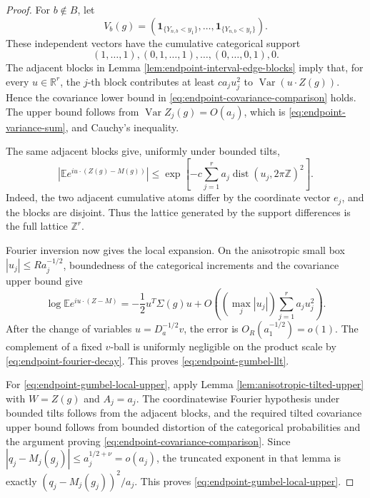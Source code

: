 \documentclass[11pt]{article}
\theoremstyle{remark}
\newcommand{\Ee}{\mathbb E}
\newcommand{\one}{\mathbf 1}
\newcommand{\Var}{\operatorname{Var}}
\begin{document}
\begin{proof}
For \(b\notin B\), let
\[
        V_b(g)=
        (\one_{\{Y_{n,b}<y_1\}},\ldots,
         \one_{\{Y_{n,b}<y_r\}}).
\]
These independent vectors have the cumulative categorical support
\[
        (1,\ldots,1),(0,1,\ldots,1),\ldots,(0,\ldots,0,1),0.
\]
The adjacent blocks in Lemma \ref{lem:endpoint-interval-edge-blocks} imply
that, for every \(u\in\mathbb R^r\), the \(j\)-th block contributes at least
\(ca_ju_j^2\) to \(\Var(u\cdot Z(g))\).  Hence the covariance lower bound in
\eqref{eq:endpoint-covariance-comparison} holds.  The upper bound follows from
\(\Var Z_j(g)=O(a_j)\), which is
\eqref{eq:endpoint-variance-sum}, and Cauchy's inequality.

The same adjacent blocks give, uniformly under bounded tilts,
\[
        |\Ee e^{iu\cdot(Z(g)-M(g))}|
        \le\exp\left[-c\sum_{j=1}^r
        a_j\operatorname{dist}(u_j,2\pi\mathbb Z)^2\right].
\tag{8.15}\label{eq:endpoint-fourier-decay}
\]
Indeed, the two adjacent cumulative atoms differ by the coordinate vector
\(e_j\), and the blocks are disjoint.  Thus the lattice generated by the
support differences is the full lattice \(\mathbb Z^r\).

Fourier inversion now gives the local expansion.  On the anisotropic small box
\(|u_j|\le Ra_j^{-1/2}\), boundedness of the categorical increments and the
covariance upper bound give
\[
\log\Ee e^{iu\cdot(Z-M)}
=-\frac12u^T\Sigma(g)u
+O\left((\max_j|u_j|)\sum_{j=1}^ra_ju_j^2\right).
\]
After the change of variables \(u=D_a^{-1/2}v\), the error is
\(O_R(a_1^{-1/2})=o(1)\).  The complement of a fixed \(v\)-ball is uniformly
negligible on the product scale by \eqref{eq:endpoint-fourier-decay}.  This
proves \eqref{eq:endpoint-gumbel-llt}.

For \eqref{eq:endpoint-gumbel-local-upper}, apply Lemma
\ref{lem:anisotropic-tilted-upper} with \(W=Z(g)\) and \(A_j=a_j\).  The
coordinatewise Fourier hypothesis under bounded tilts follows from the
adjacent blocks, and the required tilted covariance upper bound follows from
bounded distortion of the categorical probabilities and the argument proving
\eqref{eq:endpoint-covariance-comparison}.  Since
\(|q_j-M_j(g_j)|\le a_j^{1/2+\nu}=o(a_j)\), the truncated exponent in that
lemma is exactly \((q_j-M_j(g_j))^2/a_j\).  This proves
\eqref{eq:endpoint-gumbel-local-upper}.
\end{proof}
\end{document}
